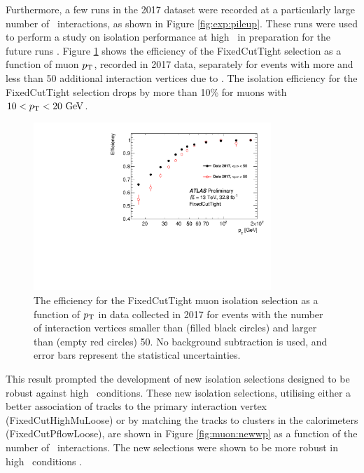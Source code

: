 Furthermore, a few runs in the 2017 dataset were recorded at a particularly large
number of \pileup~interactions, as shown in Figure \ref{fig:exp:pileup}.
These runs were used to perform a study on isolation performance at high
\pileup~in preparation for the future runs \cite{Kohler:2293040}.
Figure \ref{fig:muon:highmu} shows the efficiency of the FixedCutTight
selection as a function of muon $p_{\text{T}}$, recorded in 2017 data, separately
for events with more and less than 50 additional interaction vertices
due to \pileup. The isolation efficiency for the FixedCutTight
selection drops by more than 10\% for muons with $10 < p_{\text{T}} < 20~\text{Ge\kern -0.1em V}$.
\begin{figure}[h!]
  \centering
  \includegraphics[width=0.8\textwidth]{figures/muons/highmu}
  \caption[Muon isolation efficiency at high \pileup]{The efficiency
  for the FixedCutTight muon isolation selection as a function of $p_{\text{T}}$
  in data collected in 2017 for events with the number of interaction vertices smaller
  than (filled black circles) and larger than (empty red circles) 50.
  No background subtraction is used, and error bars represent
  the statistical uncertainties.
  }
  \label{fig:muon:highmu}
\end{figure}
This result prompted the development of new isolation selections
designed to be robust against high \pileup~conditions. These new
isolation selections, utilising either a better association of tracks
to the primary interaction vertex (FixedCutHighMuLoose) or by matching
the tracks to clusters in the calorimeters (FixedCutPflowLoose), 
are shown in Figure \ref{fig:muon:newwp} as a function of the number
of \pileup~interactions. The new selections were shown to be more
robust in high \pileup~conditions \cite{Zgubic:2320874}.
